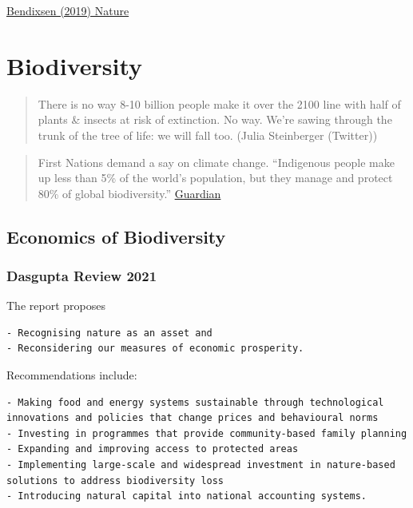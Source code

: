\documentclass[
]{book}
\begin{document}
\href{https://www.nature.com/articles/d41586-019-02042-4}{Bendixsen (2019) Nature}

\hypertarget{biodiversity}{%
\chapter{Biodiversity}\label{biodiversity}}

\begin{quote}
There is no way 8-10 billion people make it over the 2100 line with
half of plants \& insects at risk of extinction.
No way.
We're sawing through the trunk of the tree of life:
we will fall too.
(Julia Steinberger (Twitter))
\end{quote}

\begin{quote}
First Nations demand a say on climate change.
``Indigenous people make up less than 5\% of the world's population, but they manage and protect 80\% of global biodiversity.''
\href{https://www.theguardian.com/australia-news/2021/mar/27/we-want-to-be-included-first-nations-demand-a-say-on-climate-change}{Guardian}
\end{quote}

\hypertarget{economics-of-biodiversity}{%
\section{Economics of Biodiversity}\label{economics-of-biodiversity}}

\hypertarget{dasgupta-review-2021}{%
\subsection{Dasgupta Review 2021}\label{dasgupta-review-2021}}

The report proposes

\begin{verbatim}
- Recognising nature as an asset and  
- Reconsidering our measures of economic prosperity.
\end{verbatim}

Recommendations include:

\begin{verbatim}
- Making food and energy systems sustainable through technological innovations and policies that change prices and behavioural norms  
- Investing in programmes that provide community-based family planning  
- Expanding and improving access to protected areas  
- Implementing large-scale and widespread investment in nature-based solutions to address biodiversity loss  
- Introducing natural capital into national accounting systems.
\end{verbatim}
\end{document}
